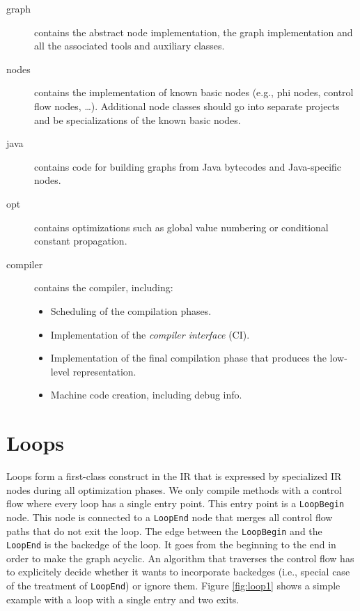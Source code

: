 \documentclass[twocolumn]{svjour3}
\newcommand\nodename[1]{\texttt{#1}}
\begin{document}
\begin{description}
    \item[graph] contains the abstract node implementation, the graph implementation and all the associated tools and auxiliary classes.
    \item[nodes] contains the implementation of known basic nodes (e.g., phi nodes, control flow nodes, \ldots).
 				 Additional node classes should go into separate projects and be specializations of the known basic nodes.
    \item[java] contains code for building graphs from Java bytecodes and Java-specific nodes.
    \item[opt] contains optimizations such as global value numbering or conditional constant propagation.
    \item[compiler] contains the compiler, including:
        \begin{itemize}
            \item Scheduling of the compilation phases.
            \item Implementation of the \emph{compiler interface} (CI).
            \item Implementation of the final compilation phase that produces the low-level representation.
            \item Machine code creation, including debug info.
        \end{itemize}
\end{description}

\section{Loops}
\label{sec:loops}
Loops form a first-class construct in the IR that is expressed by specialized IR nodes during all optimization phases.
We only compile methods with a control flow where every loop has a single entry point.
This entry point is a \nodename{LoopBegin} node.
This node is connected to a \nodename{LoopEnd} node that merges all control flow paths that do not exit the loop.
The edge between the \nodename{LoopBegin} and the \nodename{LoopEnd} is the backedge of the loop.
It goes from the beginning to the end in order to make the graph acyclic.
An algorithm that traverses the control flow has to explicitely decide whether it wants to incorporate backedges (i.e., special case of the treatment of \nodename{LoopEnd}) or ignore them.
Figure \ref{fig:loop1} shows a simple example with a loop with a single entry and two exits.
\end{document}
